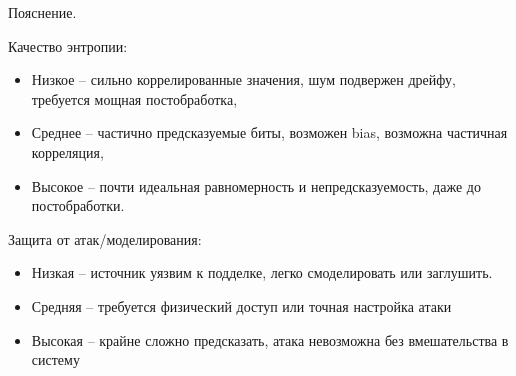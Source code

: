 \begin{landscape}
{Пояснение.

Качество энтропии:

\begin{itemize}
\item
  Низкое -- сильно коррелированные значения, шум подвержен дрейфу,
  требуется мощная постобработка,
\item
  Среднее -- частично предсказуемые биты, возможен bias, возможна
  частичная корреляция,
\item
  Высокое -- почти идеальная равномерность и непредсказуемость, даже до
  постобработки.
\end{itemize}

Защита от атак/моделирования:

\begin{itemize}
\item
  Низкая -- источник уязвим к подделке, легко смоделировать или
  заглушить.
\item
  Средняя -- требуется физический доступ или точная настройка атаки
\item
  Высокая -- крайне сложно предсказать, атака невозможна без
  вмешательства в систему
\end{itemize}
}
\end{landscape}

